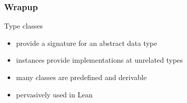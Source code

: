 \documentclass{beamer}
\begin{document}
\begin{frame}
  \frametitle{Wrapup}
  \begin{alertblock}{Type classes}
  \begin{itemize}
  \item provide a signature for an abstract data type
  \item instances provide implementations at unrelated types
  \item many classes are predefined and derivable
  \item pervasively used in Lean
  \end{itemize}
  \end{alertblock}
\end{frame}

\end{document}
